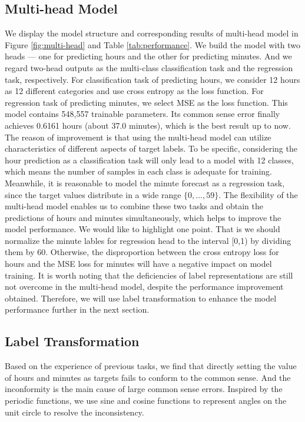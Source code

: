 \documentclass{article}
\begin{document}
\subsection{Multi-head Model}
We display the model structure and corresponding results of multi-head model in Figure \ref{fig:multi-head} and Table \ref{tab:performance}. We build the model with two heads --- one for predicting hours and the other for predicting minutes. And we regard two-head outputs as the multi-class classification task and the regression task, respectively. For classification task of predicting hours, we consider 12 hours as 12 different categories and use cross entropy as the loss function. For regression task of predicting minutes, we select MSE as the loss function. This model contains 548,557 trainable parameters. Its common sense error finally achieves 0.6161 hours (about 37.0 minutes), which is the best result up to now. The reason of improvement is that using the multi-head model can utilize characteristics of different aspects of target labels. To be specific, considering the hour prediction as a classification task will only lead to a model with 12 classes, which means the number of samples in each class is adequate for training. Meanwhile, it is reasonable to model the minute forecast as a regression task, since the target values distribute in a wide range $\{0,\dots,59\}$. The flexibility of the multi-head model enables us to combine these two tasks and obtain the predictions of hours and minutes simultaneously, which helps to improve the model performance. We would like to highlight one point. That is we should normalize the minute lables for regression head to the interval [0,1) by dividing them by 60. Otherwise, the disproportion between the cross entropy loss for hours and the MSE loss for minutes will have a negative impact on model training. It is worth noting that the deficiencies of label representations are still not overcome in the multi-head model, despite the performance improvement obtained. Therefore, we will use label transformation to enhance the model performance further in the next section.

\subsection{Label Transformation}
Based on the experience of previous tasks, we find that directly setting the value of hours and minutes as targets fails to conform to the common sense. And the inconformity is the main cause of large common sense errors. Inspired by the periodic functions, we use sine and cosine functions to represent angles on the unit circle to resolve the inconsistency.
\end{document}
